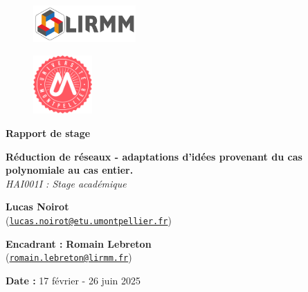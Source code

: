 \documentclass[a4paper,12pt]{report}  %
\theoremstyle{definitionstyle}
\theoremstyle{examplestyle}
\theoremstyle{remarkstyle}
\theoremstyle{propositionstyle}
\theoremstyle{theoremstyle}
\begin{document}
	
	\begin{titlepage}
		\begin{center}
			\begin{figure}[t]
				\centering
				\includegraphics[width=0.35\textwidth]{logo/logo_LIRMM.jpg} 
			\end{figure}
			\begin{figure}[t]
				\centering
				\includegraphics[width=0.2\textwidth]{logo/logo_univ_mpt.png} 
			\end{figure}
			
			\vspace{2cm}
			\Large{\textbf{Rapport de stage}}
			
			\vspace{0.5cm}
				
				 \Large{\textbf{Réduction de réseaux - adaptations d'idées provenant du cas polynomiale au cas entier.}} \\
			\vspace{0.5cm}
			\large{\textit{HAI001I : Stage académique}} \\
			
			\vspace{2cm}
			
			\large{
				\textbf{Lucas Noirot} \\
				(\texttt{\href{mailto:lucas.noirot@etu.umontpellier.fr}{lucas.noirot@etu.umontpellier.fr}})
			}
			
			\vspace{1.5cm}
			
			\large{
				\textbf{Encadrant :} \textbf{Romain Lebreton} \\
				(\texttt{\href{mailto:romain.lebreton@lirmm.fr}{romain.lebreton@lirmm.fr}})
			}
			
			\vspace{2cm}
			
			\normalsize{
				\textbf{Date :}  17 février - 26 juin 2025
			}
		\end{center}
	\end{titlepage}
	
\end{document}
